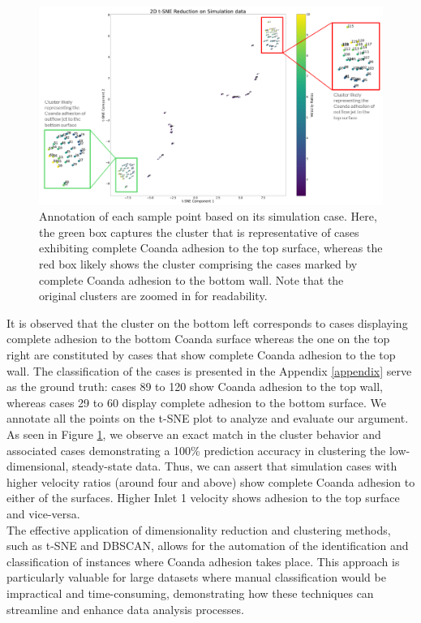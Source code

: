 \begin{figure}[ht]
    \centering
    \includegraphics[width=14cm]{images/Clustering/redgreen.png}
    \caption{Annotation of each sample point based on its simulation case. Here, the green box captures the cluster that is representative of cases exhibiting complete Coanda adhesion to the top surface, whereas the red box likely shows the cluster comprising the cases marked by complete Coanda adhesion to the bottom wall. Note that the original clusters are zoomed in for readability.}
    \label{anno}
    \end{figure}
It is observed that the cluster on the bottom left corresponds to cases displaying complete adhesion to the bottom Coanda surface whereas the one on the top right are constituted by cases that show complete Coanda adhesion to the top wall. The classification of the cases is presented in the Appendix \ref{appendix} serve as the ground truth: cases 89 to 120 show Coanda adhesion to the top wall, whereas cases 29 to 60 display complete adhesion to the bottom surface. We annotate all the points on the t-SNE plot to analyze and evaluate our argument. As seen in Figure \ref{anno}, we observe an exact match in the cluster behavior and associated cases demonstrating a 100\% prediction accuracy in clustering the low-dimensional, steady-state data. Thus, we can assert that simulation cases with higher velocity ratios (around four and above) show complete Coanda adhesion to either of the surfaces. Higher Inlet 1 velocity shows adhesion to the top surface and vice-versa. \\
The effective application of dimensionality reduction and clustering methods, such as t-SNE and DBSCAN, allows for the automation of the identification and classification of instances where Coanda adhesion takes place. This approach is particularly valuable for large datasets where manual classification would be impractical and time-consuming, demonstrating how these techniques can streamline and enhance data analysis processes. \\
